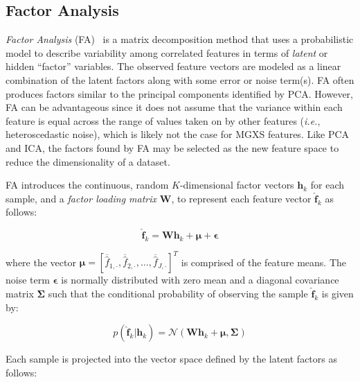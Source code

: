 \subsection{Factor Analysis}
\label{subsec:chap10-factor-analysis}

\textit{Factor Analysis} (FA)~\cite{harman1960factor} is a matrix decomposition method that uses a probabilistic model to describe variability among correlated features in terms of \textit{latent} or hidden ``factor'' variables. The observed feature vectors are modeled as a linear combination of the latent factors along with some error or noise term(s). FA often produces factors similar to the principal components identified by PCA. However, FA can be advantageous since it does not assume that the variance within each feature is equal across the range of values taken on by other features (\textit{i.e.}, heteroscedastic noise), which is likely not the case for \ac{MGXS} features. Like PCA and ICA, the factors found by FA may be selected as the new feature space to reduce the dimensionality of a dataset.

FA introduces the continuous, random $K$-dimensional factor vectors $\boldsymbol{h}_{k}$ for each sample, and a \textit{factor loading matrix} $\boldsymbol{W}$, to represent each feature vector $\boldsymbol{\hat{f}}_{k}$ as follows:

\begin{equation}
\label{eqn:chap10-fa-project}
\boldsymbol{\hat{f}}_{k} = \boldsymbol{W}\boldsymbol{h}_{k} + \boldsymbol{\mu} + \boldsymbol{\epsilon}
\end{equation}

\noindent where the vector $\boldsymbol{\mu} = \left[\overline{\hat{f}}_{1,\cdot}, \overline{\hat{f}}_{2,\cdot}, \dots, \overline{\hat{f}}_{J,\cdot}\right]^{T} $ is comprised of the feature means. The noise term $\boldsymbol{\epsilon}$ is normally distributed with zero mean and a diagonal covariance matrix $\boldsymbol{\Sigma}$ such that the conditional probability of observing the sample $\boldsymbol{\hat{f}}_{k}$ is given by:

\begin{equation}
\label{eqn:chap10-fa-prob}
p\left(\boldsymbol{\hat{f}}_{k}|\boldsymbol{h}_{k}\right) = \mathcal{N}\left(\boldsymbol{W}\boldsymbol{h}_{k} + \boldsymbol{\mu}, \boldsymbol{\Sigma}\right)
\end{equation}

\noindent Each sample is projected into the vector space defined by the latent factors as follows:

